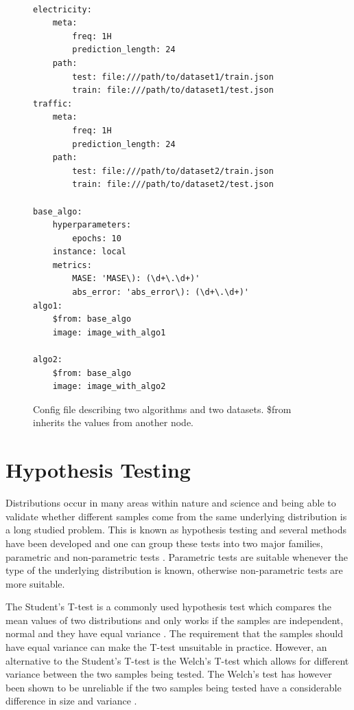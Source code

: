 \begin{figure}
  \begin{lstlisting}[]

electricity:
    meta:
        freq: 1H
        prediction_length: 24
    path:
        test: file:///path/to/dataset1/train.json
        train: file:///path/to/dataset1/test.json
traffic:
    meta:
        freq: 1H
        prediction_length: 24
    path:
        test: file:///path/to/dataset2/train.json
        train: file:///path/to/dataset2/test.json

base_algo:
    hyperparameters:
        epochs: 10
    instance: local
    metrics: 
        MASE: 'MASE\): (\d+\.\d+)'
        abs_error: 'abs_error\): (\d+\.\d+)'
algo1:
    $from: base_algo
    image: image_with_algo1

algo2:
    $from: base_algo
    image: image_with_algo2

\end{lstlisting}
  \caption{Config file describing two algorithms and two datasets. \$from inherits the values from another node.}
  \label{fig:example_config}
\end{figure}
\clearpage


\section{Hypothesis Testing}
\label{sec:hypothesis_tests}
Distributions occur in many areas within nature and science and being able to validate whether different samples come from the same underlying distribution is a long studied problem.  This is known as hypothesis testing and several methods have been developed and one can group these tests into two major families, parametric and non-parametric tests \cite{kim2015t}. Parametric tests are suitable whenever the type of the underlying distribution is known, otherwise non-parametric tests are more suitable.

The Student's T-test is a commonly used hypothesis test which compares the mean values of two distributions and only works if the samples are independent, normal and they have equal variance \cite{kim2015t}. The requirement that the samples should have equal variance can make the T-test unsuitable in practice. However, an alternative to the Student's T-test is the Welch’s T-test which allows for different variance between the two samples being tested. The Welch’s test has however been shown to be unreliable if the two samples being tested have a considerable difference in size and variance \cite{student_or_welch}.

